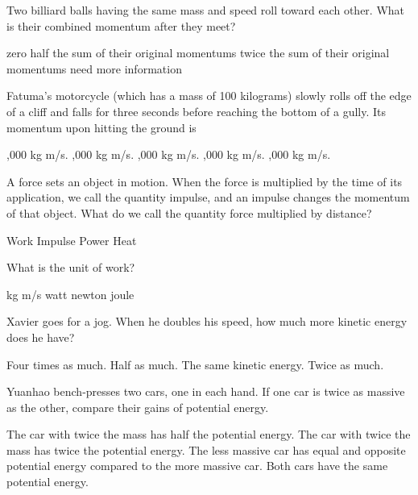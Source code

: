 \documentclass{exam}
\begin{document}
\begin{questions}
\question Two billiard balls having the same mass and speed roll toward each other. What is their combined momentum after they meet? 
\begin{choices}
  \choice zero
  \choice half the sum of their original momentums
  \choice twice the sum of their original momentums
  \choice need more information
\end{choices}
\vfill{}

\newpage{}

\question Fatuma's motorcycle (which has a mass of 100 kilograms) slowly rolls off the edge of a cliff and falls for three seconds before reaching the bottom of a gully. Its momentum upon hitting the ground is
\begin{choices}
  ,000 kg m/s.
  ,000 kg m/s.
  ,000 kg m/s.
  ,000 kg m/s.
  ,000 kg m/s.
\end{choices}
\vfill{}

\question  A force sets an object in motion. When the force is multiplied by the time of its application, we call the quantity impulse, and an impulse changes the momentum of that object. What do we call the quantity force multiplied by distance? 
\begin{choices}
  \choice Work 
  \choice Impulse
  \choice Power
  \choice Heat
\end{choices}
\vfill{}

\question  What is the unit of work? 
\begin{choices}
  \choice kg m/s 
  \choice watt
  \choice newton
  \choice joule
\end{choices}
\vfill{}

\question Xavier goes for a jog. When he doubles his speed, how much more kinetic energy does he have?
\begin{choices}
  \choice Four times as much. 
  \choice Half as much. 
  \choice The same kinetic energy. 
  \choice Twice as much. 
\end{choices}
\vfill{}

\question Yuanhao bench-presses two cars, one in each hand. If one car is twice as massive as the other, compare their gains of potential energy.  
\begin{choices}
  \choice The car with twice the mass has half the potential energy. 
  \choice The car with twice the mass has twice the potential energy. 
  \choice The less massive car has equal and opposite potential energy compared to the more massive car. 
  \choice Both cars have the same potential energy. 
\end{choices}
\vfill{}


\end{questions}
\end{document}
